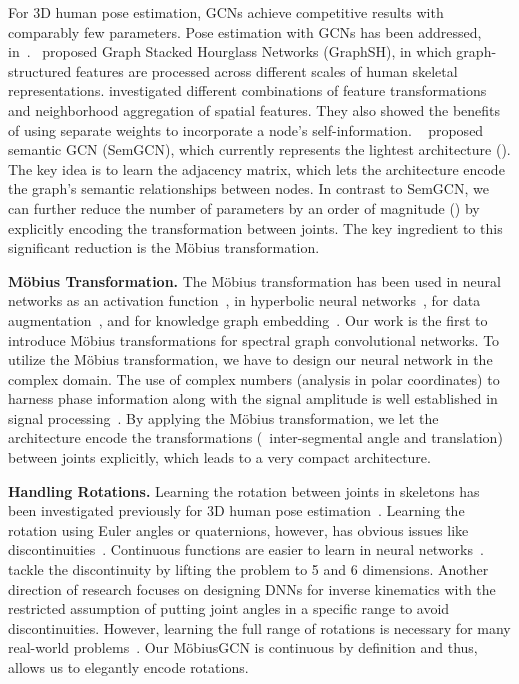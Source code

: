 \documentclass[runningheads]{llncs}
\begin{document}
For 3D human pose estimation, GCNs achieve competitive results with comparably few parameters. Pose estimation with GCNs has been addressed, \eg in~\cite{liu2020comprehensive, xu2021graph,zhaoCVPR19semantic}.~\citet{xu2021graph} proposed Graph Stacked Hourglass Networks (GraphSH), in which graph-structured features are processed across different scales of human skeletal representations. \citet{liu2020comprehensive} investigated different combinations of feature transformations and neighborhood aggregation of spatial features.
They also showed the benefits of using separate weights to incorporate a node's self-information.
~\citet{zhaoCVPR19semantic} proposed semantic GCN (SemGCN), which currently represents the lightest architecture (). The key idea is to learn the adjacency matrix, which lets the architecture encode the graph's semantic relationships between nodes. In contrast to SemGCN, we can further reduce the number of parameters by an order of magnitude () by explicitly encoding the transformation between joints. The key ingredient to this significant reduction is the M\"obius transformation.

\textbf{M\"{o}bius Transformation.} The M\"{o}bius transformation has been used in neural networks as an activation function~\cite{ozdemir2011complex,mandic2009complex}, in hyperbolic neural networks~\cite{NEURIPS2018_dbab2adc}, for data augmentation~\cite{zhou2021data}, and for knowledge graph embedding~\cite{nayyeri20205}.
Our work is the first to introduce M\"{o}bius transformations for spectral graph convolutional networks.
To utilize the M\"{o}bius transformation, we have to design our neural network in the complex domain. The use of complex numbers (analysis in polar coordinates) to harness phase information along with the signal amplitude is well established in signal processing~\cite{mandic2009complex}. By applying the M\"obius transformation, we let the architecture encode the transformations (\ie~inter-segmental angle and translation) between joints explicitly, which leads to a very compact architecture.

\textbf{Handling Rotations.} Learning the rotation between joints in skeletons has been investigated previously for 3D human pose estimation~\cite{zhou2016deep,parameswaran2004view,barron2001estimating}. Learning the rotation using Euler angles or quaternions, however, has obvious issues like discontinuities~\cite{saxena2009learning, zhou2019continuity}. 
Continuous functions are easier to learn in neural networks~\cite{zhou2019continuity}.
~\citet{zhou2019continuity} tackle the discontinuity by lifting the problem to 5 and 6 dimensions. Another direction of research focuses on designing DNNs for inverse kinematics with the restricted assumption of putting joint angles in a specific range to avoid discontinuities. However, learning the full range of rotations is necessary for many real-world problems~\cite{zhou2019continuity}. 
Our M\"obiusGCN is continuous by definition and thus, allows us to elegantly encode rotations.
\end{document}

